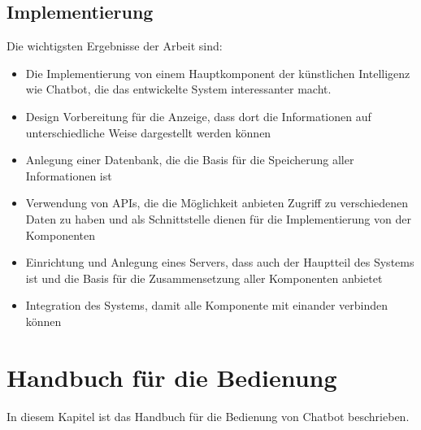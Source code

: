 \subsection{Implementierung}
Die wichtigsten Ergebnisse der Arbeit sind: 
\begin{itemize}
	\item Die Implementierung von einem Hauptkomponent der künstlichen Intelligenz wie Chatbot, die das entwickelte System interessanter macht. 
\end{itemize}
\begin{itemize}
	\item Design Vorbereitung für die Anzeige, dass dort die Informationen auf unterschiedliche Weise dargestellt werden können
\end{itemize}
\begin{itemize}
	\item Anlegung einer Datenbank, die die Basis für die Speicherung aller Informationen ist
\end{itemize}
\begin{itemize}
	\item Verwendung von APIs, die die Möglichkeit anbieten Zugriff zu verschiedenen Daten zu haben und als Schnittstelle dienen für die Implementierung von der Komponenten
\end{itemize}
\begin{itemize}
	\item 
	Einrichtung und Anlegung eines Servers, dass auch der Hauptteil des Systems ist und die Basis für die Zusammensetzung aller Komponenten anbietet
\end{itemize}
\begin{itemize}
	\item 
	Integration des Systems, damit alle Komponente mit einander verbinden können
\end{itemize}
\section{Handbuch für die Bedienung}
In diesem Kapitel ist das Handbuch für die Bedienung von Chatbot beschrieben.
